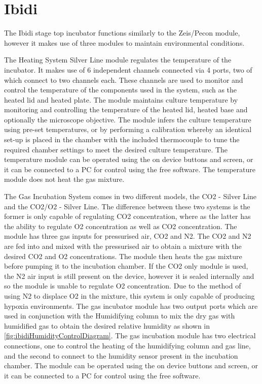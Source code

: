 \documentclass[class=report,11pt,crop=false]{standalone}
\begin{document}
	\section{Ibidi}
	The Ibidi stage top incubator functions similarly to the Zeis/Pecon module, however it makes use of three modules to maintain environmental conditions.
	
	The Heating System Silver Line\cite{ibidiIbidiHeatingSystem} module regulates the temperature of the incubator. It makes use of 6 independent channels connected via 4 ports, two of which connect to two channels each. These channels are used to monitor and control the temperature of the components used in the system, such as the heated lid and heated plate. The module maintains culture temperature by monitoring and controlling the temperature of the heated lid, heated base and optionally the microscope objective. The module infers the culture temperature using pre-set temperatures, or by performing a calibration whereby an identical set-up is placed in the chamber with the included thermocouple to tune the required chamber settings to meet the desired culture temperature. The temperature module can be operated using the on device buttons and screen, or it can be connected to a PC for control using the free software. The temperature module does not heat the gas mixture.
	
	The Gas Incubation System\cite{ibidiIbidiGasIncubation} comes in two different models, the CO2 - Silver Line and the CO2/O2 - Silver Line. The difference between these two systems is the former is only capable of regulating CO2 concentration, where as the latter has the ability to regulate O2 concentration as well as CO2 concentration. The module has three gas inputs for pressurised air, CO2 and N2. The CO2 and N2 are fed into and mixed with the pressurised air to obtain a mixture with the desired CO2 and O2 concentrations. The module then heats the gas mixture before pumping it to the incubation chamber. If the CO2 only module is used, the N2 air input is still present on the device, however it is sealed internally and so the module is unable to regulate O2 concentration. Due to the method of using N2 to displace O2 in the mixture, this system is only capable of producing hypoxia environments. The gas incubator module has two output ports which are used in conjunction with the Humidifying column to mix the dry gas with humidified gas to obtain the desired relative humidity as shown in \autoref{fig:ibidiHumidityControlDiagram}. The gas incubation module has two electrical connections, one to control the heating of the humidifying column and gas line, and the second to connect to the humidity sensor present in the incubation chamber. The module can be operated using the on device buttons and screen, or it can be connected to a PC for control using the free software.
	
\end{document}
